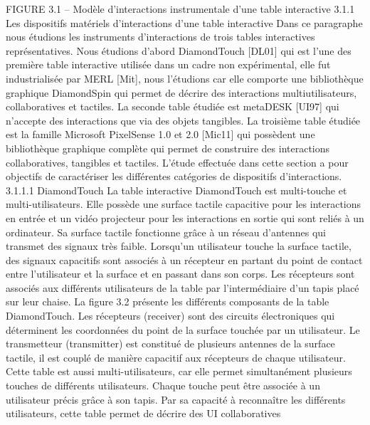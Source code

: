 \documentclass{article}
\begin{document}
FIGURE 3.1 – Mod\`{e}le d’interactions instrumentale d’une table interactive
3.1.1
Les dispositifs mat\'{e}riels d’interactions d’une table interactive
Dans ce paragraphe nous \'{e}tudions les instruments d’interactions de trois tables interactives repr\'{e}sentatives. Nous \'{e}tudions d’abord DiamondTouch [DL01] qui est l’une des premi\`{e}re table interactive
utilis\'{e}e dans un cadre non exp\'{e}rimental, elle fut industrialis\'{e}e par MERL [Mit], nous l’\'{e}tudions car
elle comporte une biblioth\`{e}que graphique DiamondSpin qui permet de d\'{e}crire des interactions multiutilisateurs, collaboratives et tactiles. La seconde table \'{e}tudi\'{e}e est metaDESK [UI97] qui n’accepte
des interactions que via des objets tangibles. La troisi\`{e}me table \'{e}tudi\'{e}e est la famille Microsoft PixelSense 1.0 et 2.0 [Mic11] qui poss\`{e}dent une biblioth\`{e}que graphique compl\`{e}te qui permet de construire
des interactions collaboratives, tangibles et tactiles.
L’\'{e}tude effectu\'{e}e dans cette section a pour objectifs de caract\'{e}riser les diff\'{e}rentes cat\'{e}gories de
dispositifs d’interactions.
3.1.1.1
DiamondTouch
La table interactive DiamondTouch est multi-touche et multi-utilisateurs. Elle poss\`{e}de une surface
tactile capacitive pour les interactions en entr\'{e}e et un vid\'{e}o projecteur pour les interactions en sortie
qui sont reli\'{e}s \`{a} un ordinateur. Sa surface tactile fonctionne gr\^{a}ce \`{a} un r\'{e}seau d’antennes qui transmet
des signaux tr\`{e}s faible. Lorsqu’un utilisateur touche la surface tactile, des signaux capacitifs sont
associ\'{e}s \`{a} un r\'{e}cepteur en partant du point de contact entre l’utilisateur et la surface et en passant dans
son corps. Les r\'{e}cepteurs sont associ\'{e}s aux diff\'{e}rents utilisateurs de la table par l’interm\'{e}diaire d’un
tapis plac\'{e} sur leur chaise. La ﬁgure 3.2 pr\'{e}sente les diff\'{e}rents composants de la table DiamondTouch.
Les r\'{e}cepteurs (receiver) sont des circuits \'{e}lectroniques qui d\'{e}terminent les coordonn\'{e}es du point de
la surface touch\'{e}e par un utilisateur. Le transmetteur (transmitter) est constitu\'{e} de plusieurs antennes
de la surface tactile, il est coupl\'{e} de mani\`{e}re capacitif aux r\'{e}cepteurs de chaque utilisateur.
Cette table est aussi multi-utilisateurs, car elle permet simultan\'{e}ment plusieurs touches de diff\'{e}rents utilisateurs. Chaque touche peut \^{e}tre associ\'{e}e \`{a} un utilisateur pr\'{e}cis gr\^{a}ce \`{a} son tapis. Par sa
capacit\'{e} \`{a} reconna\^{i}tre les diff\'{e}rents utilisateurs, cette table permet de d\'{e}crire des UI collaboratives
\end{document}
